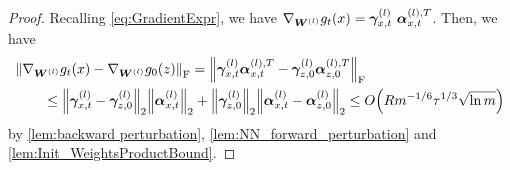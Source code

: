 \begin{proof}
  Recalling \cref{eq:GradientExpr}, we have
  $\nabla_{\bm{W}^{(l)}} g_t(x)=\bm{\gamma}^{(l)}_{x,t}\
    {\bm{\alpha}}^{(l),T}_{x,t}$.
  Then, we have
  \begin{align*}
    &\norm{\nabla_{\bm{W}^{(l)}} g_t(\x) - \nabla_{\bm{W}^{(l)}} g_0(\z)}_{\mr{F}}=\norm{\bm{\gamma}^{(l)}_{\x,t}{\bm{\alpha}}^{(l),T}_{\x,t} -\bm{\gamma}^{(l)}_{\z,0}{\bm{\alpha}}^{(l),T}_{\z,0}}_{\mr{F}}\notag \\
    &\qquad \leq \norm{\bm{\gamma}^{(l)}_{\x,t} - \bm{\gamma}^{(l)}_{\z,0}}_2\norm{{\bm{\alpha}}^{(l)}_{\x,t}}_2
    + \norm{\bm{\gamma}^{(l)}_{\z,0}}_2\norm{{\bm{\alpha}}^{(l)}_{\x,t} - {\bm{\alpha}}^{(l)}_{\z,0}}_2 \leq O\xkm{R m^{-1/6} \tau^{1/3}\sqrt{\ln m}}
  \end{align*}
  by \cref{lem:backward perturbation}, \cref{lem:NN_forward_perturbation} and \cref{lem:Init_WeightsProductBound}.

\end{proof}

